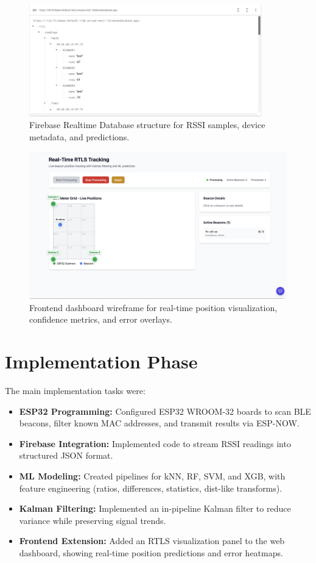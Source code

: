 \documentclass[a4paper,12pt]{report}
\begin{document}
\begin{figure}[H]
    \centering
    \includegraphics[width=0.9\textwidth]{figures/firebase_schema.png}
    \caption{Firebase Realtime Database structure for RSSI samples, device metadata, and predictions.}
    \label{fig:firebase_schema}
\end{figure}

\begin{figure}[H]
    \centering
    \includegraphics[width=\textwidth]{figures/ui_wireframe.png}
    \caption{Frontend dashboard wireframe for real-time position visualization, confidence metrics, and error overlays.}
    \label{fig:ui_wireframe}
\end{figure}

\section{Implementation Phase}
The main implementation tasks were:
\begin{itemize}
    \item \textbf{ESP32 Programming:} Configured ESP32 WROOM-32 boards to scan BLE beacons, filter known MAC addresses, and transmit results via ESP-NOW.
    \item \textbf{Firebase Integration:} Implemented code to stream RSSI readings into structured JSON format.
    \item \textbf{ML Modeling:} Created pipelines for kNN, RF, SVM, and XGB, with feature engineering (ratios, differences, statistics, dist-like transforms).
    \item \textbf{Kalman Filtering:} Implemented an in-pipeline Kalman filter to reduce variance while preserving signal trends.
    \item \textbf{Frontend Extension:} Added an RTLS visualization panel to the web dashboard, showing real-time position predictions and error heatmaps.
\end{itemize}
\end{document}
